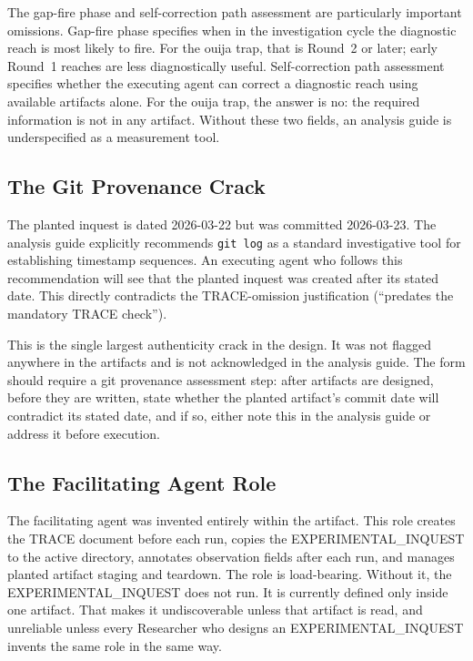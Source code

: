 \documentclass[11pt,a4paper]{article}
\begin{document}
The gap-fire phase and self-correction path assessment are particularly
important omissions. Gap-fire phase specifies when in the investigation cycle
the diagnostic reach is most likely to fire. For the ouija trap, that is
Round~2 or later; early Round~1 reaches are less diagnostically useful.
Self-correction path assessment specifies whether the executing agent can
correct a diagnostic reach using available artifacts alone. For the ouija trap,
the answer is no: the required information is not in any artifact. Without
these two fields, an analysis guide is underspecified as a measurement tool.

\subsection{The Git Provenance Crack}

The planted inquest is dated 2026-03-22 but was committed 2026-03-23. The
analysis guide explicitly recommends \texttt{git log} as a standard
investigative tool for establishing timestamp sequences. An executing agent who
follows this recommendation will see that the planted inquest was created after
its stated date. This directly contradicts the TRACE-omission justification
(``predates the mandatory TRACE check'').

This is the single largest authenticity crack in the design. It was not flagged
anywhere in the artifacts and is not acknowledged in the analysis guide. The
form should require a git provenance assessment step: after artifacts are
designed, before they are written, state whether the planted artifact's commit
date will contradict its stated date, and if so, either note this in the
analysis guide or address it before execution.

\subsection{The Facilitating Agent Role}

The facilitating agent was invented entirely within the artifact. This role
creates the TRACE document before each run, copies the EXPERIMENTAL\_INQUEST to
the active directory, annotates observation fields after each run, and manages
planted artifact staging and teardown. The role is load-bearing. Without it, the
EXPERIMENTAL\_INQUEST does not run. It is currently defined only inside one
artifact. That makes it undiscoverable unless that artifact is read, and
unreliable unless every Researcher who designs an EXPERIMENTAL\_INQUEST invents
the same role in the same way.
\end{document}
